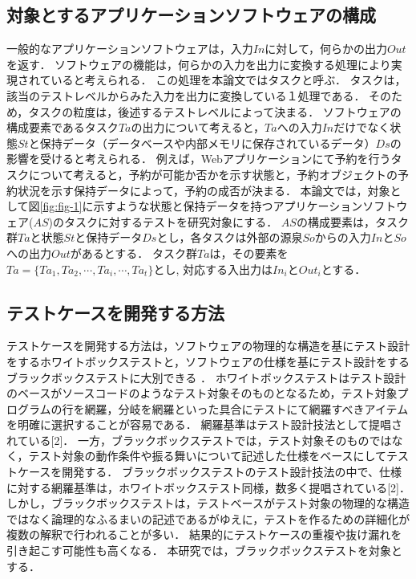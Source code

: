 \documentclass[a4paper,11pt]{jreport}
\begin{document}
\subsection{対象とするアプリケーションソフトウェアの構成}
一般的なアプリケーションソフトウェアは，入力$In$に対して，何らかの出力$Out$を返す．
ソフトウェアの機能は，何らかの入力を出力に変換する処理により実現されていると考えられる．
この処理を本論文ではタスクと呼ぶ．
タスクは，該当のテストレベルからみた入力を出力に変換している１処理である．
そのため，タスクの粒度は，後述するテストレベルによって決まる．%
ソフトウェアの構成要素であるタスク$Ta$の出力について考えると，$Ta$への入力$In$だけでなく状態$St$と保持データ（データベースや内部メモリに保存されているデータ）$Ds$の影響を受けると考えられる．
例えば，Webアプリケーションにて予約を行うタスクについて考えると，予約が可能か否かを示す状態と，予約オブジェクトの予約状況を示す保持データによって，予約の成否が決まる．
本論文では，対象として図\ref{fig:fig-1}に示すような状態と保持データを持つアプリケーションソフトウェア($AS$)のタスクに対するテストを研究対象にする．
$AS$の構成要素は，タスク群$Ta$と状態$St$と保持データ$Ds$とし，各タスクは外部の源泉$So$からの入力$In$と$So$への出力$Out$があるとする．
タスク群$Ta$は，その要素を$Ta=\{Ta_1,Ta_2,\cdots,Ta_i,\cdots,Ta_t \}$とし, 対応する入出力は$In_i$と$Out_i$とする．

\subsection{テストケースを開発する方法}
テストケースを開発する方法は，ソフトウェアの物理的な構造を基にテスト設計をするホワイトボックステストと，ソフトウェアの仕様を基にテスト設計をするブラックボックステストに大別できる\cite{myers2011art} ．
ホワイトボックステストはテスト設計のベースがソースコードのようなテスト対象そのものとなるため，テスト対象プログラムの行を網羅，分岐を網羅といった具合にテストにて網羅すべきアイテムを明確に選択することが容易である．
網羅基準はテスト設計技法として提唱されている[2]．
一方，ブラックボックステストでは，テスト対象そのものではなく，テスト対象の動作条件や振る舞いについて記述した仕様をベースにしてテストケースを開発する．
ブラックボックステストのテスト設計技法の中で、仕様に対する網羅基準は，ホワイトボックステスト同様，数多く提唱されている[2]．
しかし，ブラックボックステストは，テストベースがテスト対象の物理的な構造ではなく論理的なふるまいの記述であるがゆえに，テストを作るための詳細化が複数の解釈で行われることが多い．
結果的にテストケースの重複や抜け漏れを引き起こす可能性も高くなる．
本研究では，ブラックボックステストを対象とする．
\end{document}

